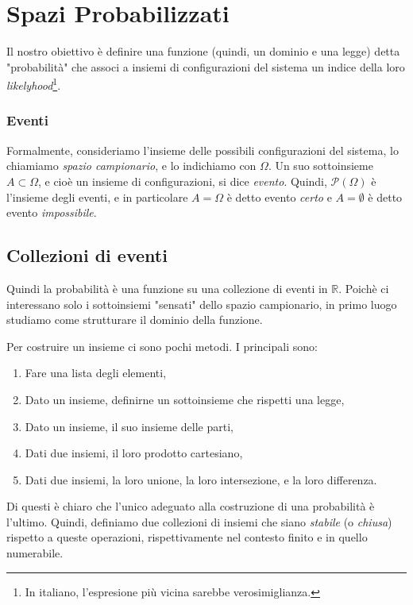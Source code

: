
\chapter{Spazi Probabilizzati}

Il nostro obiettivo è definire una funzione (quindi, un dominio e una legge) detta "probabilità" che associ a insiemi di configurazioni del sistema un indice della loro \textit{likelyhood}\footnote{In italiano, l'espresione più vicina sarebbe verosimiglianza.}.

\subsection*{Eventi}

Formalmente, consideriamo l'insieme delle possibili configurazioni del sistema, lo chiamiamo \textit{spazio campionario}, e lo indichiamo con $\Omega$. Un suo sottoinsieme $A\subset\Omega$, e cioè un insieme di configurazioni, si dice \textit{evento}. Quindi, $\mathcal{P}(\Omega)$ è l'insieme degli eventi, e in particolare $A=\Omega$ è detto evento \textit{certo} e $A=\emptyset$ è detto evento \textit{impossibile}. 

\section{Collezioni di eventi}

Quindi la probabilità è una funzione su una collezione di eventi in $\mathbb{R}$. Poichè ci interessano solo i sottoinsiemi "sensati" dello spazio campionario, in primo luogo studiamo come strutturare il dominio della funzione.

Per costruire un insieme ci sono pochi metodi. I principali sono:
\begin{enumerate}
	\item Fare una lista degli elementi,
	\item Dato un insieme, definirne un sottoinsieme che rispetti una legge,
	\item Dato un insieme, il suo insieme delle parti,
	\item Dati due insiemi, il loro prodotto cartesiano,
	\item Dati due insiemi, la loro unione, la loro intersezione, e la loro differenza.
\end{enumerate}
Di questi è chiaro che l'unico adeguato alla costruzione di una probabilità è l'ultimo. Quindi, definiamo due collezioni di insiemi che siano \textit{stabile} (o \textit{chiusa}) rispetto a queste operazioni, rispettivamente nel contesto finito e in quello numerabile.


